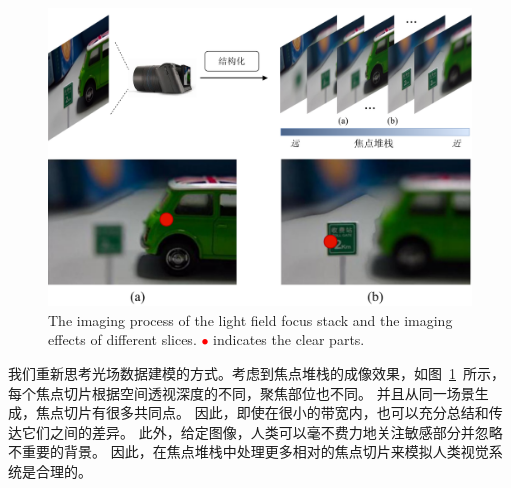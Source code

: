 \begin{figure}[ht]
	\centering
	\includegraphics[width=0.85\linewidth]{figures/chapter3/cpt3_idea.pdf}
	{ %
		The imaging process of the light field focus stack and the imaging effects of different slices.
		\textcolor{red}{$\bullet$} indicates the clear parts.  
	}
	\label{figure:cpt3:idea}
	
\end{figure}
%
%
%
%
我们重新思考光场数据建模的方式。考虑到焦点堆栈的成像效果，如图~\ref{figure:cpt3:idea}~所示，每个焦点切片根据空间透视深度的不同，聚焦部位也不同。 并且从同一场景生成，焦点切片有很多共同点。
因此，即使在很小的带宽内，也可以充分总结和传达它们之间的差异。 此外，给定图像，人类可以毫不费力地关注敏感部分并忽略不重要的背景。 因此，在焦点堆栈中处理更多相对的焦点切片来模拟人类视觉系统是合理的。 
%
%
%
%
\par
%
%


